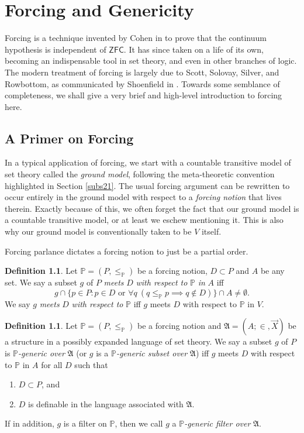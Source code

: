 \documentclass[12pt, twoside]{memoir}
\numberwithin{equation}{section}
\theoremstyle{definition}
\newtheorem{defi}[thm]{Definition}
\theoremstyle{remark}
\theoremstyle{definition}
\theoremstyle{definition}
\theoremstyle{definition}
\theoremstyle{remark}
\begin{document}
\chapter{Forcing and Genericity}\label{subs24}

Forcing is a technique invented by Cohen in \cite{cohen1} to prove that the continuum hypothesis is independent of $\mathsf{ZFC}$. It has since taken on a life of its own, becoming an indispensable tool in set theory, and even in other branches of logic. The modern treatment of forcing is largely due to Scott, Solovay, Silver, and Rowbottom, as communicated by Shoenfield in \cite{shoenfield}. Towards some semblance of completeness, we shall give a very brief and high-level introduction to forcing here.

\section{A Primer on Forcing}

In a typical application of forcing, we start with a countable transitive model of set theory called the \emph{ground model}, following the meta-theoretic convention highlighted in Section \ref{subs21}. The usual forcing argument can be rewritten to occur entirely in the ground model with respect to a \emph{forcing notion} that lives therein. Exactly because of this, we often forget the fact that our ground model is a countable transitive model, or at least we eschew mentioning it. This is also why our ground model is conventionally taken to be $V$ itself. 

Forcing parlance dictates a forcing notion to just be a partial order. 

\begin{defi}
Let $\mathbb{P} = (P, \leq_{\mathbb{P}})$ be a forcing notion, $D \subset P$ and $A$ be any set. We say a subset $g$ of $P$ \emph{meets} $D$ \emph{with respect to} $\mathbb{P}$ \emph{in} $A$ iff $$g \cap \{p \in P : p \in D \text{ or } \forall q \ (q \leq_{\mathbb{P}} p \implies q \not\in D)\} \cap A \neq \emptyset.$$ We say $g$ \emph{meets} $D$ \emph{with respect to} $\mathbb{P}$ iff $g$ meets $D$ with respect to $\mathbb{P}$ in $V$.
\end{defi}

\begin{defi}
Let $\mathbb{P} = (P, \leq_{\mathbb{P}})$ be a forcing notion and $\mathfrak{A} = (A; \in, \Vec{X})$ be a structure in a possibly expanded language of set theory. We say a subset $g$ of $P$ is $\mathbb{P}$\emph{-generic over} $\mathfrak{A}$ (or $g$ is a $\mathbb{P}$\emph{-generic subset over} $\mathfrak{A}$) iff $g$ meets $D$ with respect to $\mathbb{P}$ in $A$ for all $D$ such that
\begin{enumerate}[label=(\alph*)]
    \item $D \subset P$, and
    \item $D$ is definable in the language associated with $\mathfrak{A}$.
\end{enumerate}
If in addition, $g$ is a filter on $\mathbb{P}$, then we call $g$ a $\mathbb{P}$\emph{-generic filter over} $\mathfrak{A}$.
\end{defi}
\end{document}

